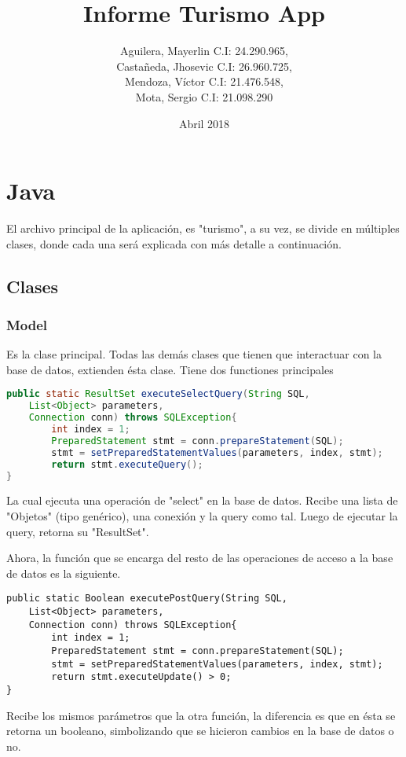 \documentclass{article}
\title{Informe Turismo App}
\date{Abril 2018}
\author{Aguilera, Mayerlin C.I: 24.290.965,\\
        Castañeda, Jhosevic C.I: 26.960.725, \\
        Mendoza, Víctor C.I: 21.476.548, \\
        Mota, Sergio C.I: 21.098.290}
\begin{document}
\maketitle
\newpage
\tableofcontents
\newpage

\section{Java}
El archivo principal de la aplicación, es "turismo", a su vez, se divide en múltiples clases, donde cada una será explicada con más detalle a continuación.

\subsection{Clases}
    \subsubsection{Model}
        Es la clase principal. Todas las demás clases que tienen que interactuar con la base de datos, extienden ésta clase. Tiene dos functiones principales
        \begin{lstlisting}[language=Java]
public static ResultSet executeSelectQuery(String SQL,
    List<Object> parameters,
    Connection conn) throws SQLException{
        int index = 1;
        PreparedStatement stmt = conn.prepareStatement(SQL);
        stmt = setPreparedStatementValues(parameters, index, stmt);
        return stmt.executeQuery();
}
        \end{lstlisting}
        La cual ejecuta una operación de "select" en la base de datos. Recibe una lista de "Objetos" (tipo genérico), una conexión y la query como tal.
        Luego de ejecutar la query, retorna su "ResultSet".
        
        Ahora, la función que se encarga del resto de las operaciones de acceso a la base de datos es la siguiente.
        \begin{lstlisting}
public static Boolean executePostQuery(String SQL,
    List<Object> parameters,
    Connection conn) throws SQLException{
        int index = 1;
        PreparedStatement stmt = conn.prepareStatement(SQL);
        stmt = setPreparedStatementValues(parameters, index, stmt);
        return stmt.executeUpdate() > 0;
}
        \end{lstlisting}
        Recibe los mismos parámetros que la otra función, la diferencia es que en ésta se retorna un booleano, simbolizando que se hicieron cambios en la base de datos o no.
        
\end{document}

